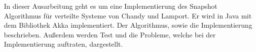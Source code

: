 In dieser Ausarbeitung geht es um eine Implementierung des Snapshot Algorithmus für verteilte Systeme von Chandy und Lamport. 
Er wird in Java mit dem Bibliothek Akka implementiert.
Der Algorithmus, sowie die Implementierung beschrieben.
Außerdem werden Test und die Probleme, welche bei der Implementierung auftraten, dargestellt.